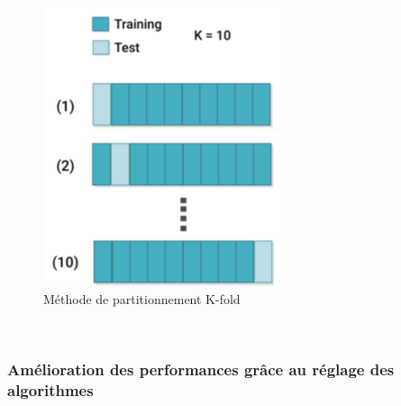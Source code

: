 \begin{figure}[ht!]
        \centering
        \includegraphics[width=0.4\linewidth]{Rapport/images/k-fold.png}
        \caption{Méthode de partitionnement K-fold}
        \label{fig:k-fold}
\end{figure}\\
    
\subsubsection{Amélioration des performances grâce au réglage des algorithmes}\\

